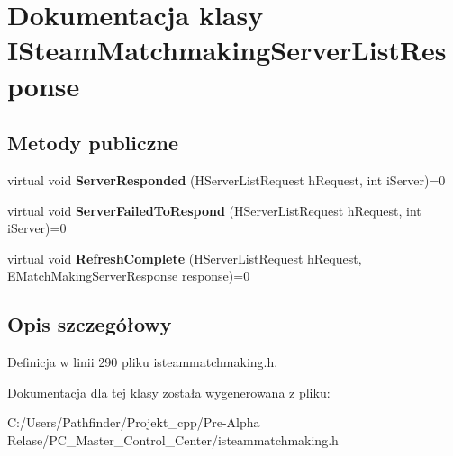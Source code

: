 \hypertarget{class_i_steam_matchmaking_server_list_response}{}\section{Dokumentacja klasy I\+Steam\+Matchmaking\+Server\+List\+Response}
\label{class_i_steam_matchmaking_server_list_response}
\subsection*{Metody publiczne}
\begin{DoxyCompactItemize}
\item 
\mbox{\label{class_i_steam_matchmaking_server_list_response_a84943bac8948e9bc187e83b26016512b}} 
virtual void {\bfseries Server\+Responded} (H\+Server\+List\+Request h\+Request, int i\+Server)=0
\item 
\mbox{\label{class_i_steam_matchmaking_server_list_response_abfdc3be88438c2a0cef2b323e61221c1}} 
virtual void {\bfseries Server\+Failed\+To\+Respond} (H\+Server\+List\+Request h\+Request, int i\+Server)=0
\item 
\mbox{\label{class_i_steam_matchmaking_server_list_response_a1f2906cd276b437d44a817438ad9f1c1}} 
virtual void {\bfseries Refresh\+Complete} (H\+Server\+List\+Request h\+Request, E\+Match\+Making\+Server\+Response response)=0
\end{DoxyCompactItemize}


\subsection{Opis szczegółowy}


Definicja w linii 290 pliku isteammatchmaking.\+h.



Dokumentacja dla tej klasy została wygenerowana z pliku\+:\begin{DoxyCompactItemize}
\item 
C\+:/\+Users/\+Pathfinder/\+Projekt\+\_\+cpp/\+Pre-\/\+Alpha Relase/\+P\+C\+\_\+\+Master\+\_\+\+Control\+\_\+\+Center/isteammatchmaking.\+h\end{DoxyCompactItemize}
